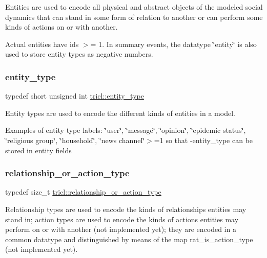 Entities are used to encode all physical and abstract objects of the modeled social dynamics that can stand in some form of relation to another or can perform some kinds of actions on or with another. 

Actual entities have ids $>$= 1. In summary events, the datatype \char`\"{}entity\char`\"{} is also used to store entity types as negative numbers. \mbox{\label{namespacetricl_afd4de3aedd5e48cf955f03457386e98f}} 
\subsubsection{\texorpdfstring{entity\+\_\+type}{entity\_type}}
{\footnotesize\ttfamily typedef short unsigned int \hyperlink{namespacetricl_afd4de3aedd5e48cf955f03457386e98f}{tricl\+::entity\+\_\+type}}



Entity types are used to encode the different kinds of entities in a model. 

Examples of entity type labels\+: \char`\"{}user\char`\"{}, \char`\"{}message\char`\"{}, \char`\"{}opinion\char`\"{}, \char`\"{}epidemic status\char`\"{}, \char`\"{}religious group\char`\"{}, \char`\"{}household\char`\"{}, \char`\"{}news channel\char`\"{}$>$=1 so that -\/entity\+\_\+type can be stored in entity fields \mbox{\label{namespacetricl_a2d01894944fb58a8fedc0912a48d13f8}} 
\subsubsection{\texorpdfstring{relationship\+\_\+or\+\_\+action\+\_\+type}{relationship\_or\_action\_type}}
{\footnotesize\ttfamily typedef size\+\_\+t \hyperlink{namespacetricl_a2d01894944fb58a8fedc0912a48d13f8}{tricl\+::relationship\+\_\+or\+\_\+action\+\_\+type}}



Relationship types are used to encode the kinds of relationships entities may stand in; action types are used to encode the kinds of actions entities may perform on or with another (not implemented yet); they are encoded in a common datatype and distinguished by means of the map rat\+\_\+is\+\_\+action\+\_\+type (not implemented yet). 

